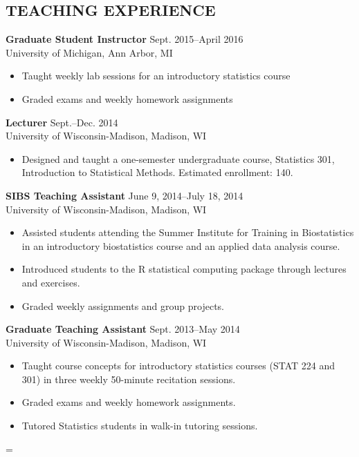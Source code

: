 \documentclass[line]{res}
\newenvironment{absolutelynopagebreak}
  {\par\nobreak\vfil\penalty0\vfilneg
   \vtop\bgroup}
  {\par\xdef\tpd{\the\prevdepth}\egroup
   \prevdepth=\tpd}
\begin{document}
\begin{resume}
\section{TEACHING EXPERIENCE}
{\bf Graduate Student Instructor} \hfill Sept. 2015--April 2016\\
University of Michigan, Ann Arbor, MI
\begin{itemize}
\item Taught weekly lab sessions for an introductory statistics course
\item Graded exams and weekly homework assignments 
\end{itemize}
{\bf Lecturer} \hfill Sept.--Dec. 2014 \\
University of Wisconsin-Madison, Madison, WI
\begin{itemize}  %
\item Designed and taught a one-semester
  undergraduate course, Statistics 301, Introduction
  to Statistical Methods. Estimated enrollment: 140. 
\end{itemize}
{\bf SIBS Teaching Assistant}  \hfill June 9,
2014--July 18, 2014\\
University of Wisconsin-Madison, Madison, WI
\begin{itemize}
\item Assisted students attending the Summer Institute for Training in
  Biostatistics in an introductory biostatistics course and an
  applied data analysis course.
\item Introduced students to the R
  statistical computing package through
  lectures and exercises.
\item Graded weekly assignments and group
  projects.
\end{itemize}
\vspace{12pt}
\begin{absolutelynopagebreak}
{\bf Graduate Teaching Assistant} \hfill Sept. 2013--May 2014\\
University of Wisconsin-Madison, Madison, WI
\begin{itemize}
\item Taught course concepts for introductory statistics courses (STAT
  224 and 301) in
  three weekly 50-minute recitation sessions.
\item Graded exams and weekly
  homework assignments.
\item Tutored Statistics students in walk-in
  tutoring sessions.
\end{itemize}
\end{absolutelynopagebreak}

\end{resume}
\end{document}
